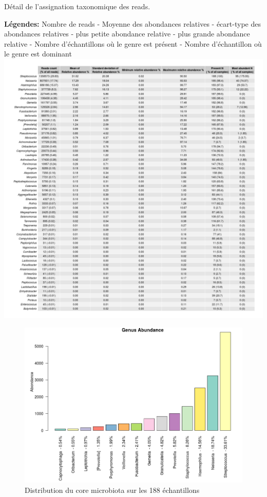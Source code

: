 \documentclass[12pt,a4paper]{article}
\begin{document}
\begin{table}[H]
\begin{center}
\caption{Détail de l'assignation taxonomique des reads.} \textbf{Légendes:} Nombre de reads - Moyenne des abondances relatives - écart-type des abondances relatives - plus petite abondance relative - plus grande abondance relative - Nombre d'échantillons où le genre est présent - Nombre d'échantillon où le genre est dominant
\label{alltable}
\hspace*{-2.8cm}
\includegraphics[scale=0.48]{img/alld.png}\hfill
\end{center}

\end{table}


\begin{figure}[t]
\begin{center}
\includegraphics[scale=0.6]{img/core.png}\hfill
\end{center}
\caption{Distribution du core microbiota sur les 188 échantillons}
\label{core}
\end{figure}
\end{document}
